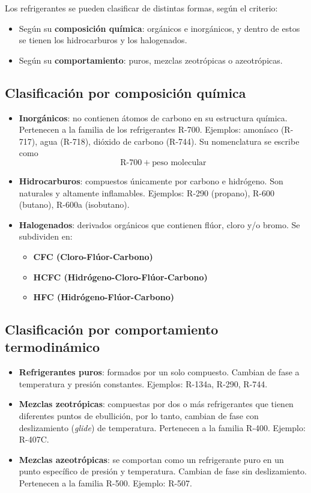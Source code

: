 Los refrigerantes se pueden clasificar de distintas formas, según el criterio:

\begin{itemize}
	\item Según su \textbf{composición química}: orgánicos e inorgánicos, y dentro de estos se tienen los hidrocarburos y los halogenados.
	\item Según su \textbf{comportamiento}: puros, mezclas zeotrópicas o azeotrópicas.
\end{itemize}

\subsection{Clasificación por composición química}

\begin{itemize}
	\item \textbf{Inorgánicos}: no contienen átomos de carbono en su estructura química. Pertenecen a la familia de los refrigerantes R-700. Ejemplos: amoníaco (R-717), agua (R-718), dióxido de carbono (R-744). Su nomenclatura se escribe como \[\text{R-}700 + \text{peso molecular}\]
	\item \textbf{Hidrocarburos}: compuestos únicamente por carbono e hidrógeno. Son naturales y altamente inflamables. Ejemplos: R-290 (propano), R-600 (butano), R-600a (isobutano).
	\item \textbf{Halogenados}: derivados orgánicos que contienen flúor, cloro y/o bromo. Se subdividen en:
	\begin{itemize}
		\item \textbf{CFC (Cloro-Flúor-Carbono)}
		\item \textbf{HCFC (Hidrógeno-Cloro-Flúor-Carbono)}
		\item \textbf{HFC (Hidrógeno-Flúor-Carbono)}
	\end{itemize}
\end{itemize}

\subsection{Clasificación por comportamiento termodinámico}

\begin{itemize}
	\item \textbf{Refrigerantes puros}: formados por un solo compuesto. Cambian de fase a temperatura y presión constantes. Ejemplos: R-134a, R-290, R-744.
	\item \textbf{Mezclas zeotrópicas}: compuestas por dos o más refrigerantes que tienen diferentes puntos de ebullición, por lo tanto, cambian de fase con deslizamiento (\emph{glide}) de temperatura. Pertenecen a la familia R-400. Ejemplo: R-407C.
	\item \textbf{Mezclas azeotrópicas}: se comportan como un refrigerante puro en un punto específico de presión y temperatura. Cambian de fase sin deslizamiento. Pertenecen a la familia R-500. Ejemplo: R-507.
\end{itemize}

